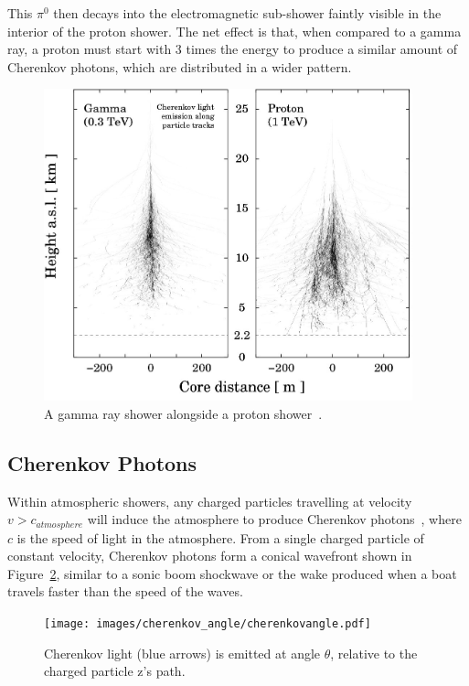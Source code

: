   This $\pi^{0}$ then decays into the electromagnetic sub-shower faintly visible in the interior of the proton shower.
  The net effect is that, when compared to a gamma ray, a proton must start with 3 times the energy to produce a similar amount of Cherenkov photons, which are distributed in a wider pattern.

  \begin{figure}[ht]
    \centering
    \includegraphics[width=0.95\textwidth]{images/showers_gamma_proton}
    \caption[Gamma Ray and Proton Showers]{
      A gamma ray shower alongside a proton shower~\cite{Bernlohr2008149}.
    }
    \label{fig:gamma_vs_proton_airshower}
  \end{figure}
  
  \FloatBarrier

  \subsection{Cherenkov Photons}\label{sec:cherenkov}

  Within atmospheric showers, any charged particles travelling at velocity $v > c_{atmosphere}$ will induce the atmosphere to produce Cherenkov photons~\cite{cherenkov}, where $c$ is the speed of light in the atmosphere.
  From a single charged particle of constant velocity, Cherenkov photons form a conical wavefront shown in Figure~\ref{fig:cherenkovangle}, similar to a sonic boom shockwave or the wake produced when a boat travels faster than the speed of the waves.

  \begin{figure}[ht]
    \centering
    \texttt{[image: images/cherenkov\_angle/cherenkovangle.pdf]}
    \caption[Chernekov Emission Angle]{
      Cherenkov light (blue arrows) is emitted at angle $\theta$, relative to the charged particle z's path.
    }
    \label{fig:cherenkovangle}
  \end{figure}

